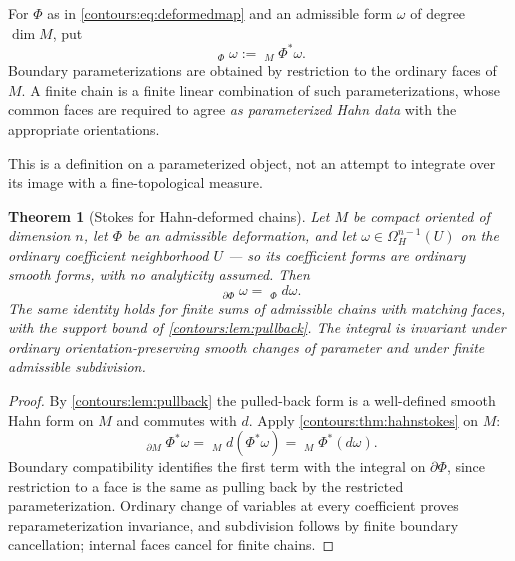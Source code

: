 \documentclass[11pt,letterpaper]{article}
\newtheorem{theorem}{Theorem}[section]
\theoremstyle{definition}
\theoremstyle{remark}
\newcommand{\HInt}{\mathop{\int^{\!H}}\nolimits}
\numberwithin{equation}{section}
\begin{document}
\begin{definition}
\label{contours:def:deformedintegral}
For $\Phi$ as in \eqref{contours:eq:deformedmap} and an admissible form $\omega$ of
degree $\dim M$, put
\[
  \HInt_\Phi\omega:=\HInt_M\Phi^*\omega .
\]
Boundary parameterizations are obtained by restriction to the ordinary faces of
$M$. A finite chain is a finite linear combination of such parameterizations, whose
common faces are required to agree \emph{as parameterized Hahn data} with the
appropriate orientations.
\end{definition}

This is a definition on a parameterized object, not an attempt to integrate over its
image with a fine-topological measure.

\begin{theorem}[Stokes for Hahn-deformed chains]
\label{contours:thm:deformedstokes}
Let $M$ be compact oriented of dimension $n$, let $\Phi$ be an admissible
deformation, and let $\omega\in\Omega_H^{n-1}(U)$ on the ordinary coefficient
neighborhood $U$ --- so its coefficient forms are ordinary \emph{smooth} forms,
with no analyticity assumed. Then
\begin{equation}\label{contours:eq:deformedstokes}
 \boxed{\qquad
 \HInt_{\partial\Phi}\omega=\HInt_\Phi d\omega .
 \qquad}
\end{equation}
The same identity holds for finite sums of admissible chains with matching faces,
with the support bound of \cref{contours:lem:pullback}. The integral is invariant
under ordinary orientation-preserving smooth changes of parameter and under finite
admissible subdivision.
\end{theorem}
\begin{proof}
By \cref{contours:lem:pullback} the pulled-back form is a well-defined smooth Hahn
form on $M$ and commutes with $d$. Apply \cref{contours:thm:hahnstokes} on $M$:
\[
  \HInt_{\partial M}\Phi^*\omega
  =\HInt_Md(\Phi^*\omega)
  =\HInt_M\Phi^*(d\omega).
\]
Boundary compatibility identifies the first term with the integral on
$\partial\Phi$, since restriction to a face is the same as pulling back by the
restricted parameterization. Ordinary change of variables at every coefficient
proves reparameterization invariance, and subdivision follows by finite boundary
cancellation; internal faces cancel for finite chains.
\end{proof}
\end{document}
